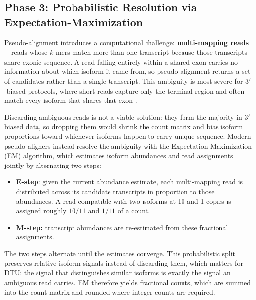 \subsection{Phase 3: Probabilistic Resolution via Expectation-Maximization}
Pseudo-alignment introduces a computational challenge: \textbf{multi-mapping reads}---reads whose $k$-mers match more than one transcript because those transcripts share exonic sequence. A read falling entirely within a shared exon carries no information about which isoform it came from, so pseudo-alignment returns a set of candidates rather than a single transcript. This ambiguity is most severe for $3'$-biased protocols, where short reads capture only the terminal region and often match every isoform that shares that exon \cite{galfre2021cotan}.

Discarding ambiguous reads is not a viable solution: they form the majority in $3'$-biased data, so dropping them would shrink the count matrix and bias isoform proportions toward whichever isoforms happen to carry unique sequence. Modern pseudo-aligners instead resolve the ambiguity with the Expectation-Maximization (EM) algorithm, which estimates isoform abundances and read assignments jointly by alternating two steps:

\begin{itemize}
    \item \textbf{E-step}: given the current abundance estimate, each multi-mapping read is distributed across its candidate transcripts in proportion to those abundances. A read compatible with two isoforms at 10 and 1 copies is assigned roughly $10/11$ and $1/11$ of a count.
    \item \textbf{M-step:} transcript abundances are re-estimated from these fractional assignments.
\end{itemize}

The two steps alternate until the estimates converge. This probabilistic split preserves relative isoform signals instead of discarding them\cite{he2022alevin}, which matters for DTU: the signal that distinguishes similar isoforms is exactly the signal an ambiguous read carries. EM therefore yields fractional counts, which are summed into the count matrix and rounded where integer counts are required.

